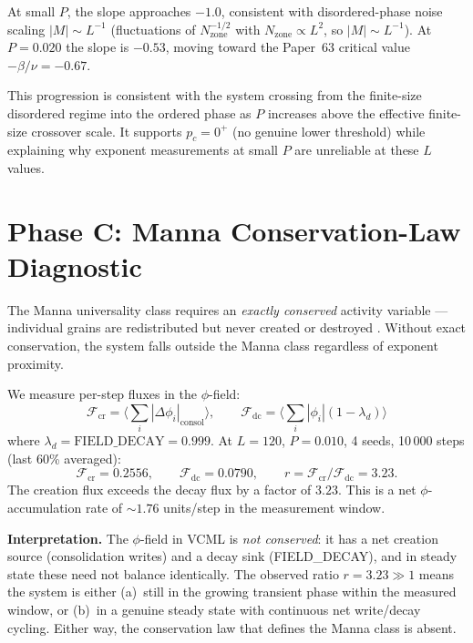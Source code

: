 \documentclass[twocolumn,10pt]{article}
\begin{document}
At small $P$, the slope approaches $-1.0$, consistent with disordered-phase
noise scaling $|M|\sim L^{-1}$ (fluctuations of $N_\mathrm{zone}^{-1/2}$
with $N_\mathrm{zone} \propto L^2$, so $|M|\sim L^{-1}$).
At $P=0.020$ the slope is $-0.53$, moving toward the Paper~63 critical value
$-\beta/\nu = -0.67$.

This progression is consistent with the system crossing from the finite-size
disordered regime into the ordered phase as $P$ increases above the effective
finite-size crossover scale.
It supports $p_c = 0^+$ (no genuine lower threshold) while explaining
why exponent measurements at small $P$ are unreliable at these $L$ values.

\section{Phase C: Manna Conservation-Law Diagnostic}

The Manna universality class requires an \emph{exactly conserved} activity
variable --- individual grains are redistributed but never created or
destroyed \cite{Vespignani1998}.
Without exact conservation, the system falls outside the Manna class
regardless of exponent proximity.

We measure per-step fluxes in the $\phi$-field:
\begin{equation}
  \mathcal{F}_\mathrm{cr} = \bigl\langle\textstyle\sum_i |\Delta\phi_i|_\mathrm{consol}\bigr\rangle,
  \qquad
  \mathcal{F}_\mathrm{dc} = \bigl\langle\textstyle\sum_i |\phi_i|(1-\lambda_d)\bigr\rangle
\end{equation}
where $\lambda_d = \text{FIELD\_DECAY} = 0.999$.
At $L=120$, $P=0.010$, 4 seeds, 10\,000 steps (last 60\% averaged):
\begin{equation}
  \mathcal{F}_\mathrm{cr} = 0.2556, \qquad \mathcal{F}_\mathrm{dc} = 0.0790,
  \qquad r = \mathcal{F}_\mathrm{cr} / \mathcal{F}_\mathrm{dc} = 3.23.
\end{equation}
The creation flux exceeds the decay flux by a factor of $3.23$.
This is a net $\phi$-accumulation rate of $\sim\!1.76$ units/step in the measurement window.

\textbf{Interpretation.}
The $\phi$-field in VCML is \emph{not conserved}: it has a net creation source
(consolidation writes) and a decay sink (FIELD\_DECAY), and in steady state
these need not balance identically.
The observed ratio $r = 3.23 \gg 1$ means the system is either
(a)~still in the growing transient phase within the measured window, or
(b)~in a genuine steady state with continuous net write/decay cycling.
Either way, the conservation law that defines the Manna class is absent.
\end{document}
